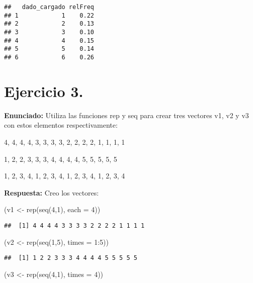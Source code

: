 \documentclass[
]{article}
\newenvironment{Shaded}{\begin{snugshade}}{\end{snugshade}}
\newcommand{\AttributeTok}[1]{\textcolor[rgb]{0.77,0.63,0.00}{#1}}
\newcommand{\DecValTok}[1]{\textcolor[rgb]{0.00,0.00,0.81}{#1}}
\newcommand{\FunctionTok}[1]{\textcolor[rgb]{0.00,0.00,0.00}{#1}}
\newcommand{\NormalTok}[1]{#1}
\newcommand{\OtherTok}[1]{\textcolor[rgb]{0.56,0.35,0.01}{#1}}
\newcommand{\SpecialCharTok}[1]{\textcolor[rgb]{0.00,0.00,0.00}{#1}}
\begin{document}
\begin{verbatim}
##   dado_cargado relFreq
## 1            1    0.22
## 2            2    0.13
## 3            3    0.10
## 4            4    0.15
## 5            5    0.14
## 6            6    0.26
\end{verbatim}

\hypertarget{ejercicio-3.}{%
\section{Ejercicio 3.}\label{ejercicio-3.}}

\textbf{Enunciado:} Utiliza las funciones rep y seq para crear tres
vectores v1, v2 y v3 con estos elementos respectivamente:

4, 4, 4, 4, 3, 3, 3, 3, 2, 2, 2, 2, 1, 1, 1, 1

1, 2, 2, 3, 3, 3, 4, 4, 4, 4, 5, 5, 5, 5, 5

1, 2, 3, 4, 1, 2, 3, 4, 1, 2, 3, 4, 1, 2, 3, 4

\textbf{Respuesta:} Creo los vectores:

\begin{Shaded}
\begin{Highlighting}[]
\NormalTok{(v1 }\OtherTok{\textless{}{-}} \FunctionTok{rep}\NormalTok{(}\FunctionTok{seq}\NormalTok{(}\DecValTok{4}\NormalTok{,}\DecValTok{1}\NormalTok{), }\AttributeTok{each =} \DecValTok{4}\NormalTok{))}
\end{Highlighting}
\end{Shaded}

\begin{verbatim}
##  [1] 4 4 4 4 3 3 3 3 2 2 2 2 1 1 1 1
\end{verbatim}

\begin{Shaded}
\begin{Highlighting}[]
\NormalTok{(v2 }\OtherTok{\textless{}{-}} \FunctionTok{rep}\NormalTok{(}\FunctionTok{seq}\NormalTok{(}\DecValTok{1}\NormalTok{,}\DecValTok{5}\NormalTok{), }\AttributeTok{times =} \DecValTok{1}\SpecialCharTok{:}\DecValTok{5}\NormalTok{))}
\end{Highlighting}
\end{Shaded}

\begin{verbatim}
##  [1] 1 2 2 3 3 3 4 4 4 4 5 5 5 5 5
\end{verbatim}

\begin{Shaded}
\begin{Highlighting}[]
\NormalTok{(v3 }\OtherTok{\textless{}{-}} \FunctionTok{rep}\NormalTok{(}\FunctionTok{seq}\NormalTok{(}\DecValTok{4}\NormalTok{,}\DecValTok{1}\NormalTok{), }\AttributeTok{times =} \DecValTok{4}\NormalTok{))}
\end{Highlighting}
\end{Shaded}
\end{document}
